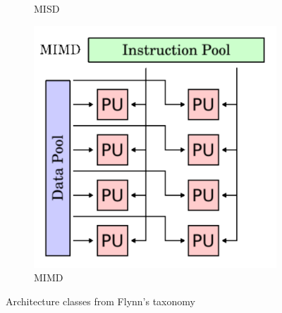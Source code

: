 \documentclass[a4paper, 11pt]{report}
\begin{document}
\begin{figure}[ht]
\begin{subfigure}[t]{0.4\textwidth}
		\caption{MISD}\label{fig:misd}
	\end{subfigure}
	\begin{subfigure}[t]{0.4\textwidth}
		\centering
		\includegraphics[scale=.3]{images/mimd.pdf}
		\caption{MIMD}\label{fig:mimd}
	\end{subfigure}
	\caption{Architecture classes from Flynn's taxonomy}\label{fig:archFlynnTax}
\end{figure}
\end{document}
